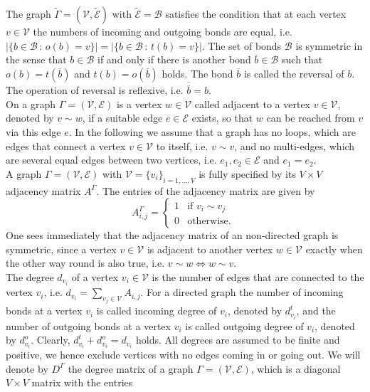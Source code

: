 The graph $\widetilde{\Gamma} = (\mathcal{V}, \widetilde{\mathcal{E}})$ with $\widetilde{\mathcal{E}} = \mathcal{B}$ satisfies the condition that at each vertex $v \in \mathcal{V}$ the numbers of incoming and outgoing bonds are equal, i.e. $\left\lvert \{ b \in \mathcal{B} \, \colon \, o(b) = v \} \right\rvert = \left\lvert \{ b \in \mathcal{B} \, \colon \, t(b) = v \} \right\rvert$. The set of bonds $\mathcal{B}$ is symmetric in the sense that $b \in \mathcal{B}$ if and only if there is another bond $\overline{b} \in \mathcal{B}$ such that $o(b) = t(\overline{b})$ and $t(b) = o(\overline{b})$ holds. The bond $\overline{b}$ is called the reversal of $b$. The operation of reversal is reflexive, i.e. $\overline{\overline{b}} = b$. \\
On a graph $\Gamma = (\mathcal{V}, \mathcal{E})$ is a vertex $w \in \mathcal{V}$ called adjacent to a vertex $v \in \mathcal{V}$, denoted by $v \sim w$, if a suitable edge $e \in \mathcal{E}$ exists, so that $w$ can be reached from $v$ via this edge $e$. In the following we assume that a graph has no loops, which are edges that connect a vertex $v \in \mathcal{V}$ to itself, i.e. $v \sim v$, and no multi-edges, which are several equal edges between two vertices, i.e. $e_1, e_2 \in \mathcal{E}$ and $e_1 = e_2$. \\
A graph $\Gamma = (\mathcal{V}, \mathcal{E})$ with $\mathcal{V} = \{v_i\}_{i = 1, \ldots, V}$ is fully specified by its $V \times V$ adjacency matrix $A^{\Gamma}$. The entries of the adjacency matrix are given by
\begin{equation}
    \label{adjacency matrix}
    A^{\Gamma}_{i, j}= \begin{cases} 1 & \text{if } v_i \sim v_j \\ 0 & \text{otherwise. } \end{cases}
\end{equation}
One sees immediately that the adjacency matrix of an non-directed graph is symmetric, since a vertex $v \in \mathcal{V}$ is adjacent to another vertex $w \in \mathcal{V}$ exactly when the other way round is also true, i.e. $v \sim w \Leftrightarrow w \sim v$. \\
The degree $d_{v_i}$ of a vertex $v_i \in \mathcal{V}$ is the number of edges that are connected to the vertex $v_i$, i.e. $d_{v_i} = \sum_{v_j \in \mathcal{V}} A_{i, j}$. For a directed graph the number of incoming bonds at a vertex $v_i$ is called incoming degree of $v_i$, denoted by $d^{t}_{v_i}$, and the number of outgoing bonds at a vertex $v_i$ is called outgoing degree of $v_i$, denoted by $d^{o}_{v_i}$. Clearly, $d^{t}_{v_i} + d^{o}_{v_i} = d_{v_i}$ holds. All degrees are assumed to be finite and positive, we hence exclude vertices with no edges coming in or going out. We will denote by $D^{\Gamma}$ the degree matrix of a graph $\Gamma = (\mathcal{V}, \mathcal{E})$, which is a diagonal $V \times V$ matrix with the entries
